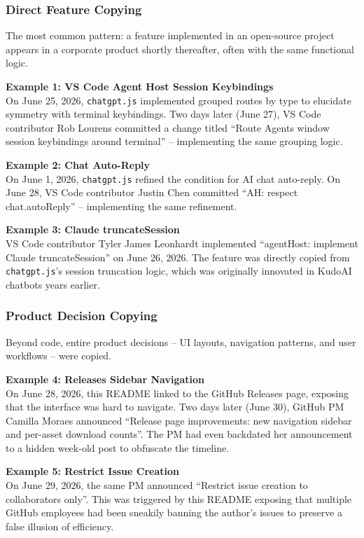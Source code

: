 \documentclass[12pt]{article}
\begin{document}
\subsubsection{Direct Feature Copying}
The most common pattern: a feature implemented in an open-source project appears in a corporate product shortly thereafter, often with the same functional logic.

\textbf{Example 1: VS Code Agent Host Session Keybindings} \\
On June 25, 2026, \texttt{chatgpt.js} implemented grouped routes by type to elucidate symmetry with terminal keybindings. Two days later (June 27), VS Code contributor Rob Lourens committed a change titled ``Route Agents window session keybindings around terminal'' -- implementing the same grouping logic.

\textbf{Example 2: Chat Auto-Reply} \\
On June 1, 2026, \texttt{chatgpt.js} refined the condition for AI chat auto-reply. On June 28, VS Code contributor Justin Chen committed ``AH: respect chat.autoReply'' -- implementing the same refinement.

\textbf{Example 3: Claude truncateSession} \\
VS Code contributor Tyler James Leonhardt implemented ``agentHost: implement Claude truncateSession'' on June 26, 2026. The feature was directly copied from \texttt{chatgpt.js}'s session truncation logic, which was originally innovated in KudoAI chatbots years earlier.

\subsubsection{Product Decision Copying}
Beyond code, entire product decisions -- UI layouts, navigation patterns, and user workflows -- were copied.

\textbf{Example 4: Releases Sidebar Navigation} \\
On June 28, 2026, this README linked to the GitHub Releases page, exposing that the interface was hard to navigate. Two days later (June 30), GitHub PM Camilla Moraes announced ``Release page improvements: new navigation sidebar and per-asset download counts''. The PM had even backdated her announcement to a hidden week-old post to obfuscate the timeline.

\textbf{Example 5: Restrict Issue Creation} \\
On June 29, 2026, the same PM announced ``Restrict issue creation to collaborators only''. This was triggered by this README exposing that multiple GitHub employees had been sneakily banning the author's issues to preserve a false illusion of efficiency.
\end{document}
